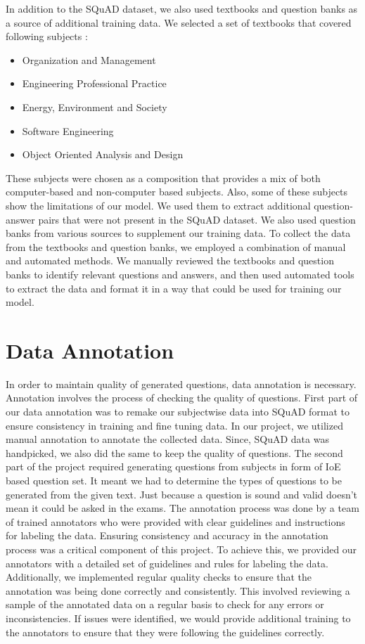 \documentclass[12pt]{report}
\begin{document}
In addition to the SQuAD dataset, we also used textbooks and question banks as a source of additional training data. We selected a set of textbooks that covered following subjects :
\begin{itemize}
    \item Organization and Management
    \item Engineering Professional Practice
    \item Energy, Environment and Society
    \item Software Engineering
    \item Object Oriented Analysis and Design
\end{itemize}
These subjects were chosen as a composition that provides a mix of both computer-based and non-computer based subjects. Also, some of these subjects show the limitations of our model. We used them to extract additional question-answer pairs that were not present in the SQuAD dataset. We also used question banks from various sources to supplement our training data.
To collect the data from the textbooks and question banks, we employed a combination of manual and automated methods. We manually reviewed the textbooks and question banks to identify relevant questions and answers, and then used automated tools to extract the data and format it in a way that could be used for training our model.


\section{Data Annotation}
In order to maintain quality of generated questions,
data annotation is necessary. Annotation involves the process of checking the quality of questions.  First part of our data annotation was to remake our subjectwise data into SQuAD format to ensure consistency in training and fine tuning data. In our project, we utilized manual annotation to annotate the collected data.  Since, SQuAD data was handpicked, we also did the same to keep the quality of questions. The second part of the project required generating questions from subjects in form of IoE based question set. It meant we had to determine the types of questions to be generated from the given text. Just because a question is sound and valid doesn't mean it could be asked in the exams. The annotation process was done by a team of trained annotators who were
provided with clear guidelines and instructions for labeling the data. Ensuring consistency and accuracy in the annotation process was a critical component of this project. To achieve this, we provided our annotators with a detailed set of guidelines and rules for labeling the data. Additionally, we implemented regular quality checks to ensure that the annotation was being done correctly and consistently. This involved reviewing a sample of the annotated data on a regular basis to check for any errors or inconsistencies. If issues were identified,
we would provide additional training to the annotators to ensure that they were following the guidelines correctly.
\end{document}
